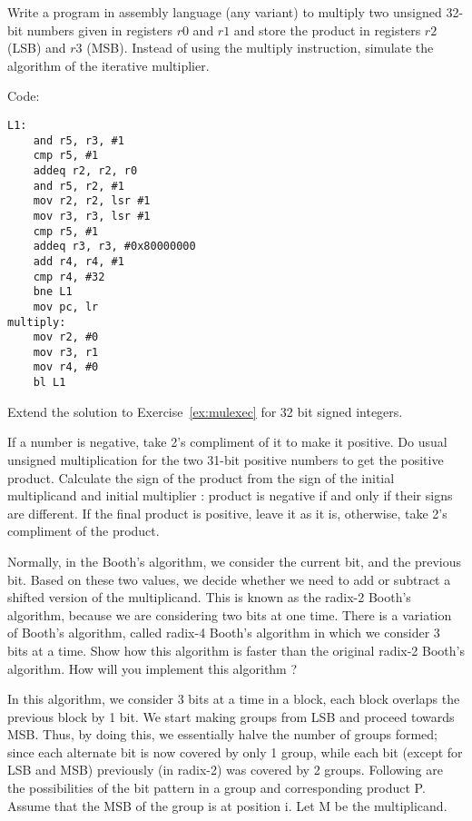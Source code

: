 \begin{ExerciseList}

\Exercise
\label{ex:mulexec}
Write a program  in assembly language (any variant) to multiply two unsigned 32-bit numbers given in
registers $r0$ and $r1$ 
and store the product in registers $r2$ (LSB) and $r3$ (MSB). Instead of using the multiply
instruction, simulate the algorithm
of the iterative multiplier. 

\Answer Code:
\begin{Verbatim}[frame=single]
L1:
	and r5, r3, #1
	cmp r5, #1
	addeq r2, r2, r0
	and r5, r2, #1
	mov r2, r2, lsr #1
	mov r3, r3, lsr #1
	cmp r5, #1
	addeq r3, r3, #0x80000000
	add r4, r4, #1
	cmp r4, #32
	bne L1
	mov pc, lr
multiply:
	mov r2, #0
	mov r3, r1
	mov r4, #0
	bl L1
\end{Verbatim}


\Exercise
Extend the solution to Exercise~\ref{ex:mulexec} for 32 bit signed integers.

\Answer
If a number is negative, take 2's compliment of it to make it positive. Do usual unsigned multiplication for the two
31-bit positive numbers to get the positive product. Calculate the sign of the product from the sign of the initial
multiplicand and initial multiplier : product is negative if and only if their signs are different. If the final product
is positive, leave it as it is, otherwise, take 2's compliment of the product.

\Exercise[difficulty=1]
Normally, in the Booth's algorithm, we consider the current bit, and the previous bit. Based on these two values, we
decide whether we need to add or subtract a shifted version of the multiplicand. This is known as the radix-2 Booth's
algorithm, because we are considering two bits at one time. There is a variation of Booth's algorithm, called radix-4
Booth's algorithm in which we consider 3 bits at a time. Show how this algorithm is faster than the original radix-2
Booth's algorithm. How will you implement this algorithm ?

\Answer
In this algorithm, we consider 3 bits at a time in a block, each block overlaps the previous block by 1 bit. We start
making groups from LSB and proceed towards MSB. Thus, by doing this, we essentially halve the number of groups formed;
since each alternate bit is now covered by only 1 group, while each bit (except for LSB and MSB) previously (in radix-2)
was covered by 2 groups. Following are the possibilities of the bit pattern in a group and corresponding product P.
Assume that the MSB of the group is at position i. Let M be the multiplicand.\\ 


\end{ExerciseList}
